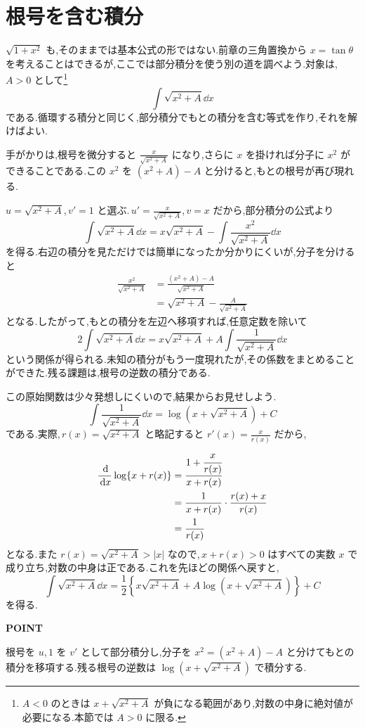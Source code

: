 \section{根号を含む積分}\label{節:平方根と部分積分}

$\sqrt{1+x^2}$ も,そのままでは基本公式の形ではない.前章の三角置換から $x=\tan\theta$ を考えることはできるが,ここでは部分積分を使う別の道を調べよう.対象は,\,$A>0$ として\footnote{$A<0$ のときは $x+\sqrt{x^2+A}$ が負になる範囲があり,対数の中身に絶対値が必要になる.本節では $A>0$ に限る.}
\[
 \int\sqrt{x^2+A}\dd x
\]
である.循環する積分と同じく,部分積分でもとの積分を含む等式を作り,それを解けばよい.

手がかりは,根号を微分すると $\frac{x}{\sqrt{x^2+A}}$ になり,さらに $x$ を掛ければ分子に $x^2$ ができることである.この $x^2$ を $(x^2+A)-A$ と分けると,もとの根号が再び現れる.

$u=\sqrt{x^2+A}$,\,$v'=1$ と選ぶ.\,$u'=\frac{x}{\sqrt{x^2+A}}$,\,$v=x$ だから,部分積分の公式より
\[
 \int\sqrt{x^2+A}\dd x
 =x\sqrt{x^2+A}-\int\frac{x^2}{\sqrt{x^2+A}}\dd x
\]
を得る.右辺の積分を見ただけでは簡単になったか分かりにくいが,分子を分けると
\[
\begin{aligned}
 \frac{x^2}{\sqrt{x^2+A}}
 &=\frac{(x^2+A)-A}{\sqrt{x^2+A}}\\
 &=\sqrt{x^2+A}-\frac{A}{\sqrt{x^2+A}}
\end{aligned}
\]
となる.したがって,もとの積分を左辺へ移項すれば,任意定数を除いて
\[
 2\int\sqrt{x^2+A}\dd x
 =x\sqrt{x^2+A}+A\int\frac1{\sqrt{x^2+A}}\dd x
\]
という関係が得られる.未知の積分がもう一度現れたが,その係数をまとめることができた.残る課題は,根号の逆数の積分である.

この原始関数は少々発想しにくいので,結果からお見せしよう.
\[
 \int\frac1{\sqrt{x^2+A}}\dd x
 =\log\left(x+\sqrt{x^2+A}\right)+C
\]
である.実際,\,$r(x)=\sqrt{x^2+A}$ と略記すると $r'(x)=\frac{x}{r(x)}$ だから,
\[
\begin{aligned}
 \frac{\,\mathrm{d}}{\,\mathrm{d} x}\log\{x+r(x)\}
 &=\cfrac{1+\cfrac{x}{r(x)}}{x+r(x)}\\
 &=\frac{1}{x+r(x)}\cdot\frac{r(x)+x}{r(x)}\\
 &=\frac1{r(x)}
\end{aligned}
\]
となる.また $r(x)=\sqrt{x^2+A}>|x|$ なので,\,$x+r(x)>0$ はすべての実数 $x$ で成り立ち,対数の中身は正である.これを先ほどの関係へ戻すと,
\[
 \int\sqrt{x^2+A}\dd x
 =\frac12\left\{x\sqrt{x^2+A}
       +A\log\left(x+\sqrt{x^2+A}\right)\right\}+C
\]
を得る.

\begin{bookpoint}
\textbf{POINT}\par
根号を $u$,\,$1$ を $v'$ として部分積分し,分子を $x^2=(x^2+A)-A$ と分けてもとの積分を移項する.残る根号の逆数は $\log\left(x+\sqrt{x^2+A}\right)$ で積分する.
\end{bookpoint}


